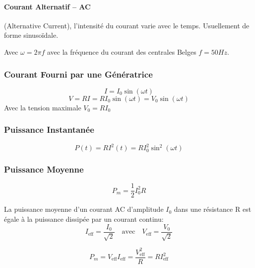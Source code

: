 \begin{multicols*}{2}
    \paragraph{Courant Alternatif -- AC} (Alternative Current), l'intensité du courant varie avec le temps. Usuellement de forme sinusoïdale.
    \begin{center}
    \end{center}
    
    Avec $\omega = 2\pi f$ avec la fréquence du courant des centrales Belges $f=50Hz$.
    
    \subsubsection{Courant Fourni par une Génératrice}
        \[ I = I_0 \sin(\omega t) \]
        \[ V = RI = RI_0\sin(\omega t) = V_0 \sin(\omega t) \]
    Avec la tension maximale $V_0 = RI_0$
    
    \subsubsection{Puissance Instantanée}
    \[ P(t) = RI^2(t) = RI_0^2\sin^2(\omega t) \]
    
    \subsubsection{Puissance Moyenne}
    \[ P_m = \frac{1}{2} I_0^2 R \]
    
    La puissance moyenne d'un courant AC d'amplitude $I_0$ dans une résistance R est égale à la puissance dissipée par un courant continu:
    \[ I_{\text{eff}} = \frac{I_0}{\sqrt{2}} \quad \text{avec} \quad V_{\text{eff}} = \frac{V_0}{\sqrt{2}} \]
    
    \[ P_m = V_{\text{eff}} I_{\text{eff}} = \frac{V_{\text{eff}}^2}{R} = RI_{\text{eff}}^2 \]
    
    
\end{multicols*}
